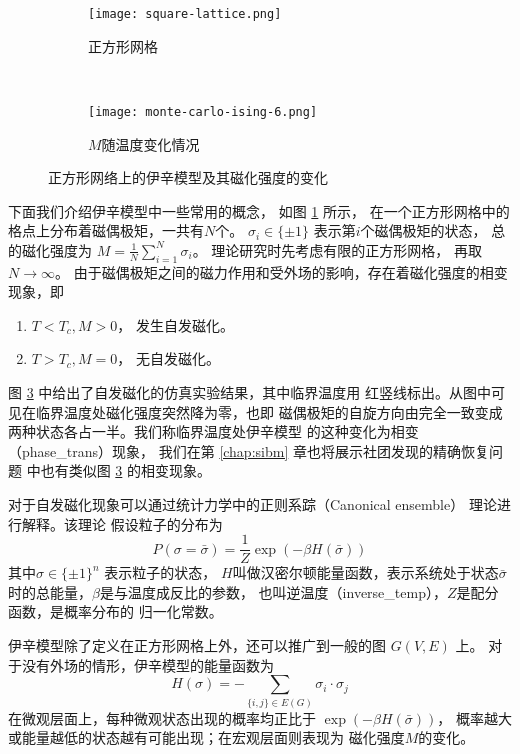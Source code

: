 \begin{figure}
	\centering
	\begin{subfigure}{0.45\textwidth}
		\texttt{[image: square-lattice.png]}
		\caption{正方形网格}\label{fig:square_lattice}
	\end{subfigure}~
	\begin{subfigure}{0.53\textwidth}
		\texttt{[image: monte-carlo-ising-6.png]}
		\caption{$M$随温度变化情况}\label{fig:square_lattice_b}
	\end{subfigure}
  \caption{正方形网络上的伊辛模型及其磁化强度的变化}
\end{figure}

下面我们介绍伊辛模型中一些常用的概念，
如图 \ref{fig:square_lattice} 所示，
在一个正方形网格中的格点上分布着磁偶极矩，一共有$N$个。
$\sigma_i \in \{ \pm 1\} $ 表示第$i$个磁偶极矩的状态，
总的磁化强度为 $M = \frac{1}{N} \sum_{i=1}^N \sigma_i$。
理论研究时先考虑有限的正方形网格， 再取 $N\to \infty$。
由于磁偶极矩之间的磁力作用和受外场的影响，存在着磁化强度的相变现象，即
\begin{enumerate}
		\item $T< T_c, M>0$， 发生自发磁化。
		\item $T> T_c, M=0$， 无自发磁化。
\end{enumerate}

图 \ref{fig:square_lattice_b} 中给出了自发磁化的仿真实验结果，其中临界温度用
红竖线标出。从图中可见在临界温度处磁化强度突然降为零，也即
磁偶极矩的自旋方向由完全一致变成两种状态各占一半。我们称临界温度处伊辛模型
的这种变化为相变（\glsdesc{phase_trans}）现象，
我们在第 \ref{chap:sibm} 章也将展示社团发现的精确恢复问题
中也有类似图 \ref{fig:square_lattice_b} 的相变现象。

对于自发磁化现象可以通过统计力学中的正则系踪（Canonical ensemble）
理论进行解释。该理论
假设粒子的分布为
\begin{equation}\label{eq:canonical_ensemble}
P(\sigma = \bar{\sigma}) = \frac{1}{Z} \exp(-\beta H(\bar{\sigma}))
\end{equation}
其中$\sigma \in \{\pm 1\}^n$ 表示粒子的状态，
$H$叫做汉密尔顿能量函数，表示系统处于状态$\bar{\sigma}$时的总能量，$\beta$是与温度成反比的参数，
也叫逆温度（\glsdesc{inverse_temp}），$Z$是配分函数，是概率分布的
归一化常数。


伊辛模型除了定义在正方形网格上外，还可以推广到一般的图 $G(V, E)$ 上。
对于没有外场的情形，伊辛模型的能量函数为
\begin{equation}\label{eq:hamiltonian}
	H(\sigma) = -\sum_{\{i,j\} \in E(G)} \sigma_i \cdot \sigma_j
\end{equation}
在微观层面上，每种微观状态出现的概率均正比于 $\exp(-\beta H(\bar{\sigma}))$，
概率越大或能量越低的状态越有可能出现；在宏观层面则表现为
磁化强度$M$的变化。

